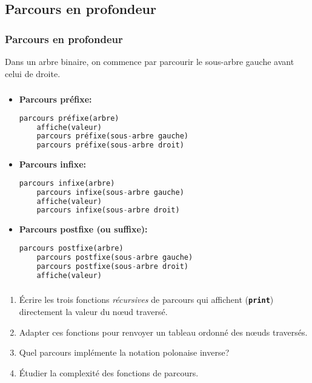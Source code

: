 \documentclass[svgnames,11pt]{beamer}
\begin{document}
\subsection{Parcours en profondeur}
\begin{frame}
    \frametitle{Parcours en profondeur}

    \begin{center}
        Dans un arbre binaire, on commence par parcourir le sous-arbre gauche avant celui de droite.
    \end{center}

\end{frame}
\begin{frame}[fragile]
    \frametitle{}

\begin{itemize}
\item<1-> \textbf{Parcours préfixe:}
\begin{lstlisting}[language=Python , basicstyle=\ttfamily\small, xleftmargin=.2em, xrightmargin=0em]
parcours préfixe(arbre)
    affiche(valeur)
    parcours préfixe(sous-arbre gauche)
    parcours préfixe(sous-arbre droit)
\end{lstlisting}
\item<2-> \textbf{Parcours infixe:}
\begin{lstlisting}[language=Python , basicstyle=\ttfamily\small, xleftmargin=.2em, xrightmargin=0em]
parcours infixe(arbre)
    parcours infixe(sous-arbre gauche)
    affiche(valeur)
    parcours infixe(sous-arbre droit)
\end{lstlisting}
\item<3-> \textbf{Parcours postfixe (ou suffixe):}
\begin{lstlisting}[language=Python , basicstyle=\ttfamily\small, xleftmargin=.2em, xrightmargin=0em]
parcours postfixe(arbre)
    parcours postfixe(sous-arbre gauche)
    parcours postfixe(sous-arbre droit)
    affiche(valeur)
\end{lstlisting}
\end{itemize}

\end{frame}
\begin{frame}
    \frametitle{}

    \begin{activite}
        \begin{enumerate}
        \item Écrire les trois fonctions \emph{récursives} de parcours qui affichent (\textbf{\texttt{print}}) directement la valeur du nœud traversé.
        \item Adapter ces fonctions pour renvoyer un tableau ordonné des nœuds traversés.
        \item Quel parcours implémente la notation polonaise inverse?
        \item Étudier la complexité des fonctions de parcours.
        \end{enumerate}
        \end{activite}

\end{frame}
\end{document}

